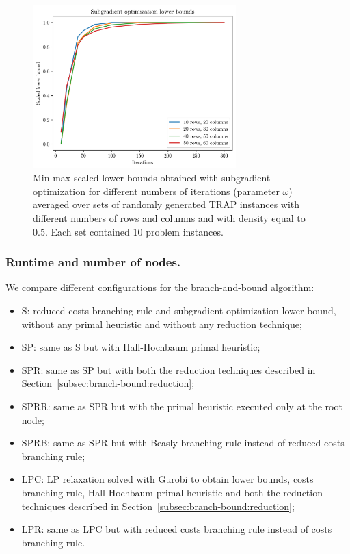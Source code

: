 \documentclass[runningheads]{llncs}
\begin{document}
\begin{figure}
  \center
  \includegraphics[width=0.7\textwidth]{img/subgrad_lb.png}
  \caption{Min-max scaled lower bounds obtained with subgradient optimization for different numbers of iterations (parameter $\omega$) averaged over sets of randomly generated TRAP instances with different numbers of rows and columns and with density equal to 0.5. Each set contained 10 problem instances.} 
  \label{fig:results:subgrad}
\end{figure}

\subsubsection{Runtime and number of nodes.} We compare different configurations for the branch-and-bound algorithm:
\begin{itemize}
  \item S: reduced costs branching rule and subgradient optimization lower bound, without any primal heuristic and without any reduction technique;
  \item SP: same as S but with Hall-Hochbaum primal heuristic;
  \item SPR: same as SP but with both the reduction techniques described in Section~\ref{subsec:branch-bound:reduction};
  \item SPRR: same as SPR but with the primal heuristic executed only at the root node;
  \item SPRB: same as SPR but with Beasly branching rule instead of reduced costs branching rule;
  \item LPC: LP relaxation solved with Gurobi to obtain lower bounds, costs branching rule, Hall-Hochbaum primal heuristic and both the reduction techniques described in Section~\ref{subsec:branch-bound:reduction};
  \item LPR: same as LPC but with reduced costs branching rule instead of costs branching rule.
\end{itemize}
\end{document}
